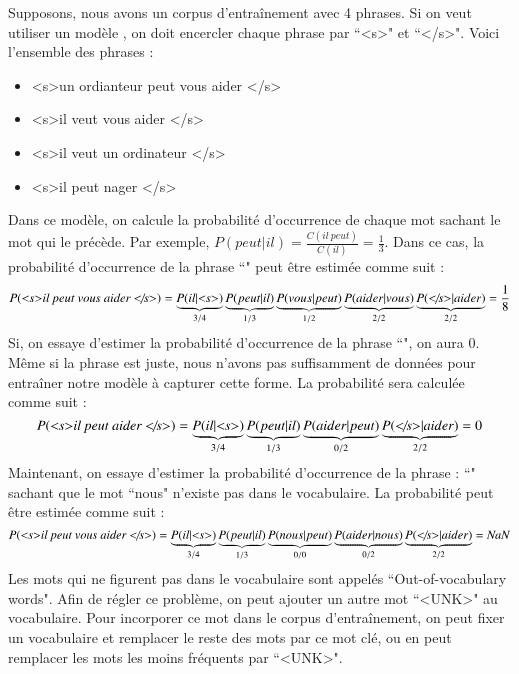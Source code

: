 \documentclass{KodeBook}
\begin{document}
Supposons, nous avons un corpus d'entraînement avec 4 phrases. 
Si on veut utiliser un modèle , on doit encercler chaque phrase par ``\textless s\textgreater" et ``\textless/s\textgreater".
Voici l'ensemble des phrases :
\begin{itemize}
	\item \textless s\textgreater un ordianteur peut vous aider \textless/s\textgreater
	\item \textless s\textgreater il veut vous aider \textless/s\textgreater
	\item \textless s\textgreater il veut un ordinateur \textless/s\textgreater
	\item \textless s\textgreater il peut nager \textless/s\textgreater
\end{itemize}
%
Dans ce modèle, on calcule la probabilité d'occurrence de chaque mot sachant le mot qui le précède. 
Par exemple, $P(peut | il) = \frac{C(il\ peut)}{C(il)} = \frac{1}{3}$.
Dans ce cas, la probabilité d'occurrence de la phrase ``" peut être estimée comme suit :
\[
P(\text{\textit{\textless s\textgreater il peut vous aider \textless/s\textgreater}}) = 
\underbrace{P(il|\text{\textit{\textless s\textgreater}})}_{3/4}
\underbrace{P(peut|il)}_{1/3} 
\underbrace{P(vous|peut)}_{1/2} 
\underbrace{P(aider|vous)}_{2/2}
\underbrace{P(\text{\textit{\textless/s\textgreater}}|aider)}_{2/2} = 
\frac{1}{8}
\]
%
Si, on essaye d'estimer la probabilité d'occurrence de la phrase ``", on aura $0$. 
Même si la phrase est juste, nous n'avons pas suffisamment de données pour entraîner notre modèle à capturer cette forme. 
La probabilité sera calculée comme suit : 
\[
P(\text{\textit{\textless s\textgreater il peut aider \textless/s\textgreater}}) = 
\underbrace{P(il|\text{\textit{\textless s\textgreater}})}_{3/4}
\underbrace{P(peut|il)}_{1/3} 
\underbrace{P(aider|peut)}_{0/2}
\underbrace{P(\text{\textit{\textless/s\textgreater}}|aider)}_{2/2} = 
0
\]
%
Maintenant, on essaye d'estimer la probabilité d'occurrence de la phrase : 
``" sachant que le mot ``nous" n'existe pas dans le vocabulaire. 
La probabilité peut être estimée comme suit : 
\[
P(\text{\textit{\textless s\textgreater il peut vous aider \textless/s\textgreater}}) = 
\underbrace{P(il|\text{\textit{\textless s\textgreater}})}_{3/4}
\underbrace{P(peut|il)}_{1/3} 
\underbrace{P(nous|peut)}_{0/0} 
\underbrace{P(aider|nous)}_{0/2}
\underbrace{P(\text{\textit{\textless/s\textgreater}}|aider)}_{2/2} = 
\text{\textit{NaN}}
\]
Les mots qui ne figurent pas dans le vocabulaire sont appelés ``Out-of-vocabulary words". 
Afin de régler ce problème, on peut ajouter un autre mot ``\textless UNK\textgreater" au vocabulaire. 
Pour incorporer ce mot dans le corpus d'entraînement, on peut fixer un vocabulaire et remplacer le reste des mots par ce mot clé, ou en peut remplacer les mots les moins fréquents par ``\textless UNK\textgreater". 
\end{document}
